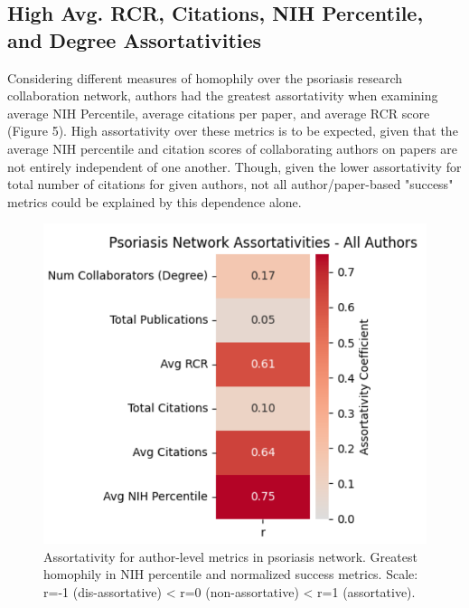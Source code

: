 \documentclass[9pt,twocolumn,twoside]{pnas-new}
\begin{document}
\subsection*{High Avg. RCR, Citations, NIH Percentile, and Degree Assortativities} Considering different measures of homophily over the psoriasis research collaboration network, authors had the greatest assortativity when examining average NIH Percentile, average citations per paper, and average RCR score (Figure 5). High assortativity over these metrics is to be expected, given that the average NIH percentile and citation scores of collaborating authors on papers are not entirely independent of one another. Though, given the lower assortativity for total number of citations for given authors, not all author/paper-based "success" metrics could be explained by this dependence alone. 
\begin{figure}[H]
    \centering
        \includegraphics[width=0.25\textheight]{Homophily.png}
    \caption{Assortativity for author-level metrics in psoriasis network. Greatest homophily in NIH percentile and normalized success metrics. Scale: r=-1 (dis-assortative) < r=0 (non-assortative) < r=1 (assortative).}

    \label{fig:homophily}
\end{figure}
\end{document}
